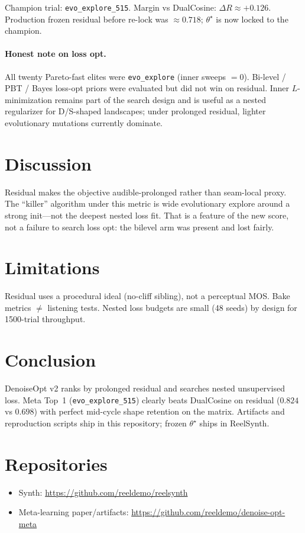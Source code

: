 \documentclass[11pt,a4paper]{article}
\begin{document}
Champion trial: \texttt{evo\_explore\_515}. Margin vs DualCosine:
$\Delta R \approx +0.126$. Production frozen residual before re-lock was
$\approx 0.718$; $\theta^\star$ is now locked to the champion.

\paragraph{Honest note on loss opt.}
All twenty Pareto-fast elites were \texttt{evo\_explore} (inner sweeps $=0$).
Bi-level / PBT / Bayes loss-opt priors were evaluated but did not win on residual.
Inner $L$-minimization remains part of the search design and is useful as a
nested regularizer for D/S-shaped landscapes; under prolonged residual, lighter
evolutionary mutations currently dominate.

\section{Discussion}
Residual makes the objective audible-prolonged rather than seam-local proxy.
The ``killer'' algorithm under this metric is wide evolutionary explore around a
strong init---not the deepest nested loss fit. That is a feature of the new
score, not a failure to search loss opt: the bilevel arm was present and lost
fairly.

\section{Limitations}
Residual uses a procedural ideal (no-cliff sibling), not a perceptual MOS.
Bake metrics $\neq$ listening tests. Nested loss budgets are small (48 seeds)
by design for 1500-trial throughput.

\section{Conclusion}
DenoiseOpt v2 ranks by prolonged residual and searches nested unsupervised loss.
Meta Top~1 (\texttt{evo\_explore\_515}) clearly beats DualCosine on residual
($0.824$ vs $0.698$) with perfect mid-cycle shape retention on the matrix.
Artifacts and reproduction scripts ship in this repository; frozen $\theta^\star$
ships in ReelSynth.

\section*{Repositories}
\begin{itemize}
  \item Synth: \url{https://github.com/reeldemo/reelsynth}
  \item Meta-learning paper/artifacts: \url{https://github.com/reeldemo/denoise-opt-meta}
\end{itemize}
\end{document}
